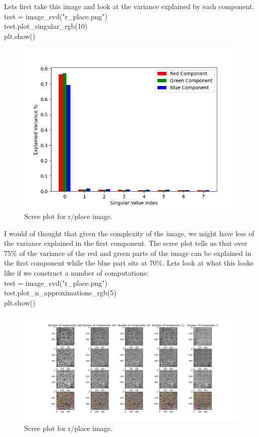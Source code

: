 \documentclass[a4paper,12pt]{article}
\newenvironment{code}{\ttfamily\\}{\\}
\newenvironment{scode}{\vspace{10pt} \begin{code}}{\vspace{10pt} \end{code}}
\begin{document}
	Lets first take this image and look at the variance explained by each component.
	\begin{scode}
		test = image\_svd("r\_place.png") \\
		test.plot\_singular\_rgb(10) \\
		plt.show()
	\end{scode} \begin{figure}
		\centering
		\includegraphics*[width = 13cm]{r_place_sv.png}
		\caption{Scree plot for r/place image.}
	\end{figure} 
	
	I would of thought that given the complexity of the image, we might have less of the variance explained in the first component. The scree plot tells us that over 75\% of the variance of the red and green parts of the image can be explained in the first component while the blue part sits at 70\%. Lets look at what this looks like if we construct a number of computations:
	\begin{scode}
		test = image\_svd("r\_place.png") \\
		test.plot\_n\_approximations\_rgb(5) \\
		plt.show()
	\end{scode} \begin{figure}[h]
		\centering
		\includegraphics*[width = 15cm]{r_place_decomposition.png}
		\caption{Scree plot for r/place image.}
	\end{figure} 
	
\end{document}
